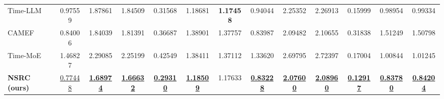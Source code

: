 \begin{table}[!t]
{\begin{tabular}{l|ccc|ccc|ccc|ccc}
Time-LLM~\cite{jin2024timellm} & 0.97559 & 1.87861 & 1.84509 & 0.31568 & 1.18681 & \textbf{1.17458} & 0.94044 & 2.25352 & 2.26913 & 0.15999 & 0.98954 & 0.99334 \\
CAMEF~\cite{zhang2025camef} & 0.84006 & 1.84039 & 1.81391 & 0.36687 & 1.38901 & 1.37757 & 0.83987 & 2.09482 & 2.10655 & 0.31838 & 1.51249 & 1.50798 \\
Time-MoE~\cite{shi2024timemoe} & 1.46827 & 2.29085 & 2.25199 & 0.42549 & 1.38411 & 1.37112 & 1.33620 & 2.69795 & 2.72397 & 0.17004 & 1.00844 & 1.01245 \\
\textbf{NSRC (ours)} & \underline{0.77448} & \underline{\textbf{1.68974}} & \underline{\textbf{1.66632}} & \underline{\textbf{0.29310}} & \underline{\textbf{1.18509}} & 1.17633 & \underline{\textbf{0.83228}} & \underline{\textbf{2.07600}} & \underline{\textbf{2.08960}} & \underline{\textbf{0.12917}} & \underline{\textbf{0.83780}} & \underline{\textbf{0.84204}} \\
\bottomrule
\end{tabular}}


\end{table}
